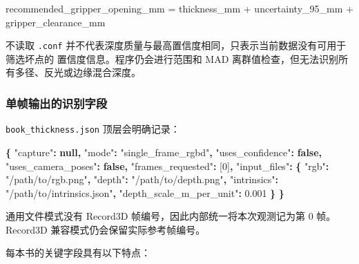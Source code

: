 \documentclass[
  chinese,
  11pt,
  a4paper,
]{article}
\newenvironment{Shaded}{\begin{snugshade}}{\end{snugshade}}
\newcommand{\DataTypeTok}[1]{\textcolor[rgb]{0.13,0.29,0.53}{#1}}
\newcommand{\DecValTok}[1]{\textcolor[rgb]{0.00,0.00,0.81}{#1}}
\newcommand{\FloatTok}[1]{\textcolor[rgb]{0.00,0.00,0.81}{#1}}
\newcommand{\FunctionTok}[1]{\textcolor[rgb]{0.13,0.29,0.53}{\textbf{#1}}}
\newcommand{\KeywordTok}[1]{\textcolor[rgb]{0.13,0.29,0.53}{\textbf{#1}}}
\newcommand{\NormalTok}[1]{#1}
\newcommand{\OtherTok}[1]{\textcolor[rgb]{0.56,0.35,0.01}{#1}}
\newcommand{\StringTok}[1]{\textcolor[rgb]{0.31,0.60,0.02}{#1}}
\begin{document}
\begin{Shaded}
\begin{Highlighting}[]
\NormalTok{recommended\_gripper\_opening\_mm}
\NormalTok{= thickness\_mm + uncertainty\_95\_mm + gripper\_clearance\_mm}
\end{Highlighting}
\end{Shaded}

不读取 \texttt{.conf}
并不代表深度质量与最高置信度相同，只表示当前数据没有可用于筛选坏点的
置信度信息。程序仍会进行范围和 MAD
离群值检查，但无法识别所有多径、反光或边缘混合深度。

\subsubsection{单帧输出的识别字段}\label{ux5355ux5e27ux8f93ux51faux7684ux8bc6ux522bux5b57ux6bb5}

\texttt{book\_thickness.json} 顶层会明确记录：

\begin{Shaded}
\begin{Highlighting}[]
\FunctionTok{\{}
  \DataTypeTok{"capture"}\FunctionTok{:} \KeywordTok{null}\FunctionTok{,}
  \DataTypeTok{"mode"}\FunctionTok{:} \StringTok{"single\_frame\_rgbd"}\FunctionTok{,}
  \DataTypeTok{"uses\_confidence"}\FunctionTok{:} \KeywordTok{false}\FunctionTok{,}
  \DataTypeTok{"uses\_camera\_poses"}\FunctionTok{:} \KeywordTok{false}\FunctionTok{,}
  \DataTypeTok{"frames\_requested"}\FunctionTok{:} \OtherTok{[}\DecValTok{0}\OtherTok{]}\FunctionTok{,}
  \DataTypeTok{"input\_files"}\FunctionTok{:} \FunctionTok{\{}
    \DataTypeTok{"rgb"}\FunctionTok{:} \StringTok{"/path/to/rgb.png"}\FunctionTok{,}
    \DataTypeTok{"depth"}\FunctionTok{:} \StringTok{"/path/to/depth.png"}\FunctionTok{,}
    \DataTypeTok{"intrinsics"}\FunctionTok{:} \StringTok{"/path/to/intrinsics.json"}\FunctionTok{,}
    \DataTypeTok{"depth\_scale\_m\_per\_unit"}\FunctionTok{:} \FloatTok{0.001}
  \FunctionTok{\}}
\FunctionTok{\}}
\end{Highlighting}
\end{Shaded}

通用文件模式没有 Record3D 帧编号，因此内部统一将本次观测记为第 0 帧。
Record3D 兼容模式仍会保留实际参考帧编号。

每本书的关键字段具有以下特点：
\end{document}
